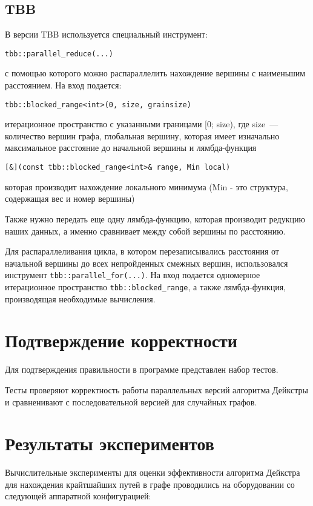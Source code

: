 \documentclass{report}
\begin{document}
\subsection*{TBB}
В версии TBB используется специальный инструмент:
\par\verb|tbb::parallel_reduce(...)|
\par с помощью которого можно распараллелить нахождение вершины с наименьшим расстоянием. На вход подается: \par\verb|tbb::blocked_range<int>(0, size, grainsize)| 
\par итерационное пространство с указанными границами [0; size), где size~--- количество вершин графа, глобальная вершину, которая имеет изначально максимальное расстояние до начальной вершины и лямбда-функция \par\verb|[&](const tbb::blocked_range<int>& range, Min local) | 
\par которая производит нахождение локального минимума (Min - это структура, содержащая вес и номер вершины) 
\par Также нужно передать еще одну лямбда-функцию, которая производит редукцию наших данных, а именно сравнивает между собой вершины по расстоянию.
\par Для распараллеливания цикла, в котором перезаписывались расстояния от начальной вершины до всех непройденных смежных вершин, использовался инструмент  \verb|tbb::parallel_for(...)|. На вход подается одномерное итерационное пространство \verb|tbb::blocked_range|, а также лямбда-функция, производящая необходимые вычисления.
\newpage


\section*{Подтверждение корректности}
Для подтверждения правильности в программе представлен набор тестов.
\par Тесты проверяют корректность работы параллельных версий алгоритма Дейкстры и сравненивают с последовательной версией для случайных графов.

\newpage

\section*{Результаты экспериментов}
Вычислительные эксперименты для оценки эффективности алгоритма Дейкстра для нахождения крайтшайших путей в графе проводились на оборудовании со следующей аппаратной конфигурацией:
\end{document}
